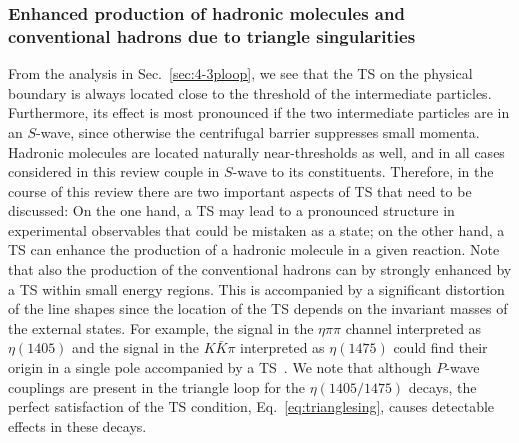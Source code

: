 \subsubsection{Enhanced production of hadronic molecules and conventional
hadrons due to triangle singularities}
\label{sec:6-ts}


From the analysis in Sec.~\ref{sec:4-3ploop}, we see that the TS on the
physical boundary is always located close to the threshold
of the intermediate particles. Furthermore, its effect is most pronounced
if  the two intermediate particles are in an $S$-wave, since otherwise the
centrifugal barrier suppresses small momenta. Hadronic
molecules are located naturally near-thresholds as well, and in all cases
considered in this review couple in
$S$-wave to its constituents. Therefore, in the course of this review there are
two important aspects of TS
that need to be discussed:
On the one hand, a TS may lead to a pronounced structure in experimental
observables that could be mistaken as a state; on the other hand, a TS can
enhance the production of a hadronic molecule in a given reaction. Note that
also the production of the conventional
hadrons can by strongly enhanced by a TS within small  energy regions.
 This is accompanied by a significant distortion of the line shapes since
 the location of the TS depends on the invariant masses of the external states.
 For example, the signal in the $\eta\pi\pi$ channel interpreted as $\eta(1405)$
 and the signal in the $K\bar{K}\pi$ interpreted as $\eta(1475)$ could
 find their origin in a single pole accompanied by a
TS~\cite{Wu:2011yx,Wu:2012pg}.
 We note that although
$P$-wave couplings are present in the triangle loop for the $\eta(1405/1475)$
decays,
the perfect satisfaction of the TS condition, Eq.~\eqref{eq:trianglesing},
causes detectable effects in these decays.


